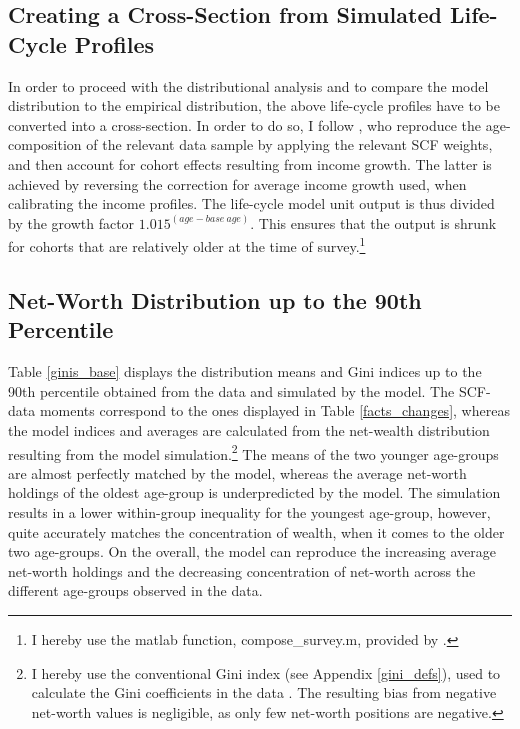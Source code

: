 \documentclass[a4paper,12pt,legno]{article}
\begin{document}
\subsection{Creating a Cross-Section from Simulated Life-Cycle Profiles}
In order to proceed with the distributional analysis and to compare the model distribution to the empirical distribution, the above life-cycle profiles have to be converted into a cross-section. In order to do so, I follow \cite{hintermaier2011}, who reproduce the age-composition of the relevant data sample by applying the relevant SCF weights, and then account for cohort effects resulting from income growth. The latter is achieved by reversing the correction for average income growth used, when calibrating the income profiles. The life-cycle model unit output is thus divided by the growth factor $1.015^{(age-base\ age)}$. This ensures that the output is shrunk for cohorts that are relatively older at the time of survey.\footnote{I hereby use the matlab function, compose\_survey.m, provided by \cite{hintermaier2016}.}

\subsection{Net-Worth Distribution up to the 90th Percentile}

Table \ref{ginis_base} displays the distribution means and Gini indices up to the 90th percentile obtained from the data and simulated by the model. The SCF-data moments correspond to the ones displayed in Table \ref{facts_changes}, whereas the model indices and averages are calculated from the net-wealth distribution resulting from the model simulation.\footnote{I hereby use the conventional Gini index (see Appendix \ref{gini_defs}), used to calculate the Gini coefficients in the data . The resulting bias from negative net-worth values \citep{chen1982} is negligible, as only few net-worth positions are negative.} The means of the two younger age-groups are almost perfectly matched by the model, whereas the average net-worth holdings of the oldest age-group is underpredicted by the model. The simulation results in a lower within-group inequality for the youngest age-group, however, quite accurately matches the concentration of wealth, when it comes to the older two age-groups. On the overall, the model can reproduce the increasing average net-worth holdings and the decreasing concentration of net-worth across the different age-groups observed in the data. 
\end{document}
